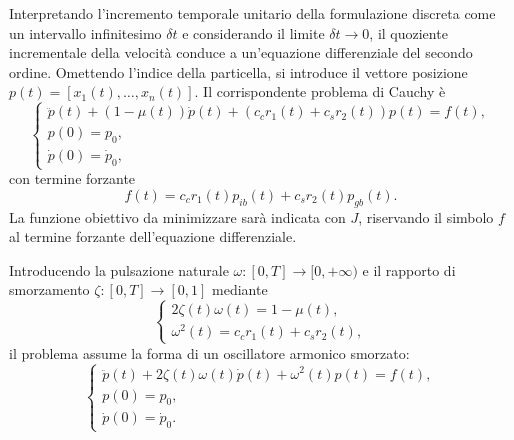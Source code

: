 Interpretando l'incremento temporale unitario della formulazione discreta come un intervallo infinitesimo $\delta t$ e considerando il limite $\delta t\to0$, il quoziente incrementale della velocit\`a conduce a un'equazione differenziale del secondo ordine. Omettendo l'indice della particella, si introduce il vettore posizione $p(t)=[x_1(t),\ldots,x_n(t)]$. Il corrispondente problema di Cauchy \`e
\begin{equation}
\begin{cases}
 \ddot p(t)+(1-\mu(t))\dot p(t)
 +(c_c r_1(t)+c_s r_2(t))p(t)=f(t),\\
 p(0)=p_0,\\
 \dot p(0)=\dot p_0,
\end{cases}
\label{eq:or-cauchy}
\end{equation}
con termine forzante
\begin{equation}
 f(t)=c_c r_1(t)p_{ib}(t)+c_s r_2(t)p_{gb}(t).
 \label{eq:or-force-time}
\end{equation}
La funzione obiettivo da minimizzare sar\`a indicata con $J$, riservando il simbolo $f$ al termine forzante dell'equazione differenziale.

Introducendo la pulsazione naturale $\omega:[0,T]\to[0,+\infty)$ e il rapporto di smorzamento $\zeta:[0,T]\to[0,1]$ mediante
\begin{equation}
\begin{cases}
 2\zeta(t)\omega(t)=1-\mu(t),\\
 \omega^2(t)=c_c r_1(t)+c_s r_2(t),
\end{cases}
\label{eq:or-oscillator-parameters}
\end{equation}
il problema assume la forma di un oscillatore armonico smorzato:
\begin{equation}
\begin{cases}
 \ddot p(t)+2\zeta(t)\omega(t)\dot p(t)
 +\omega^2(t)p(t)=f(t),\\
 p(0)=p_0,\\
 \dot p(0)=\dot p_0.
\end{cases}
\label{eq:or-oscillator}
\end{equation}

